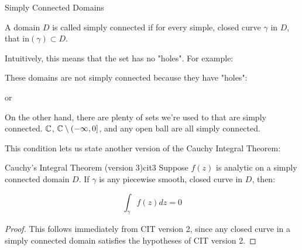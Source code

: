 \begin{defbo}{Simply Connected Domains}{}

A domain $D$ is called simply connected if for every simple, closed curve $\gamma$ in $D$, that $\mathrm{in}(\gamma) \subset D$.

\end{defbo}

Intuitively, this means that the set has no "holes". For example:

\begin{ex}{}{} These domains are not simply connected because they have "holes":

\begin{center}
\qquad or \qquad
{}

\end{center}

On the other hand, there are plenty of sets we're used to that are simply connected. $\mathbb{C}$, $\mathbb{C}\setminus (-\infty,0]$, and any open ball are all simply connected.
\end{ex}

This condition lets us state another version of the Cauchy Integral Theorem:

\begin{thmbo}{Cauchy's Integral Theorem (version 3)}{cit3} Suppose $f(z)$ is analytic on a simply connected domain $D$. If $\gamma$ is any piecewise smooth, closed curve in $D$, then:

$$\int_{\gamma}f(z)dz = 0$$
\end{thmbo}

\begin{proof} This follows immediately from CIT version 2, since any closed curve in a simply connected domain satisfies the hypotheses of CIT version 2.\end{proof}

